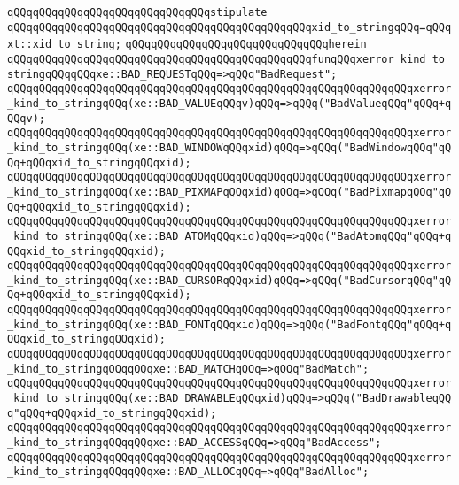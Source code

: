\newline
\verb|qQQqqQQqqQQqqQQqqQQqqQQqqQQqqQQqstipulate|\newline
\verb|qQQqqQQqqQQqqQQqqQQqqQQqqQQqqQQqqQQqqQQqqQQqqQQqxid_to_stringqQQq=qQQqxt::xid_to_string;|\newline
\verb|qQQqqQQqqQQqqQQqqQQqqQQqqQQqqQQqherein|\newline
\newline
\verb|qQQqqQQqqQQqqQQqqQQqqQQqqQQqqQQqqQQqqQQqqQQqqQQqfunqQQqxerror_kind_to_stringqQQqqQQqxe::BAD_REQUESTqQQq=>qQQq"BadRequest";|\newline
\verb|qQQqqQQqqQQqqQQqqQQqqQQqqQQqqQQqqQQqqQQqqQQqqQQqqQQqqQQqqQQqqQQqxerror_kind_to_stringqQQq(xe::BAD_VALUEqQQqv)qQQq=>qQQq("BadValueqQQq"qQQq+qQQqv);|\newline
\verb|qQQqqQQqqQQqqQQqqQQqqQQqqQQqqQQqqQQqqQQqqQQqqQQqqQQqqQQqqQQqqQQqxerror_kind_to_stringqQQq(xe::BAD_WINDOWqQQqxid)qQQq=>qQQq("BadWindowqQQq"qQQq+qQQqxid_to_stringqQQqxid);|\newline
\verb|qQQqqQQqqQQqqQQqqQQqqQQqqQQqqQQqqQQqqQQqqQQqqQQqqQQqqQQqqQQqqQQqxerror_kind_to_stringqQQq(xe::BAD_PIXMAPqQQqxid)qQQq=>qQQq("BadPixmapqQQq"qQQq+qQQqxid_to_stringqQQqxid);|\newline
\verb|qQQqqQQqqQQqqQQqqQQqqQQqqQQqqQQqqQQqqQQqqQQqqQQqqQQqqQQqqQQqqQQqxerror_kind_to_stringqQQq(xe::BAD_ATOMqQQqxid)qQQq=>qQQq("BadAtomqQQq"qQQq+qQQqxid_to_stringqQQqxid);|\newline
\verb|qQQqqQQqqQQqqQQqqQQqqQQqqQQqqQQqqQQqqQQqqQQqqQQqqQQqqQQqqQQqqQQqxerror_kind_to_stringqQQq(xe::BAD_CURSORqQQqxid)qQQq=>qQQq("BadCursorqQQq"qQQq+qQQqxid_to_stringqQQqxid);|\newline
\verb|qQQqqQQqqQQqqQQqqQQqqQQqqQQqqQQqqQQqqQQqqQQqqQQqqQQqqQQqqQQqqQQqxerror_kind_to_stringqQQq(xe::BAD_FONTqQQqxid)qQQq=>qQQq("BadFontqQQq"qQQq+qQQqxid_to_stringqQQqxid);|\newline
\verb|qQQqqQQqqQQqqQQqqQQqqQQqqQQqqQQqqQQqqQQqqQQqqQQqqQQqqQQqqQQqqQQqxerror_kind_to_stringqQQqqQQqxe::BAD_MATCHqQQq=>qQQq"BadMatch";|\newline
\verb|qQQqqQQqqQQqqQQqqQQqqQQqqQQqqQQqqQQqqQQqqQQqqQQqqQQqqQQqqQQqqQQqxerror_kind_to_stringqQQq(xe::BAD_DRAWABLEqQQqxid)qQQq=>qQQq("BadDrawableqQQq"qQQq+qQQqxid_to_stringqQQqxid);|\newline
\verb|qQQqqQQqqQQqqQQqqQQqqQQqqQQqqQQqqQQqqQQqqQQqqQQqqQQqqQQqqQQqqQQqxerror_kind_to_stringqQQqqQQqxe::BAD_ACCESSqQQq=>qQQq"BadAccess";|\newline
\verb|qQQqqQQqqQQqqQQqqQQqqQQqqQQqqQQqqQQqqQQqqQQqqQQqqQQqqQQqqQQqqQQqxerror_kind_to_stringqQQqqQQqxe::BAD_ALLOCqQQq=>qQQq"BadAlloc";|\newline

